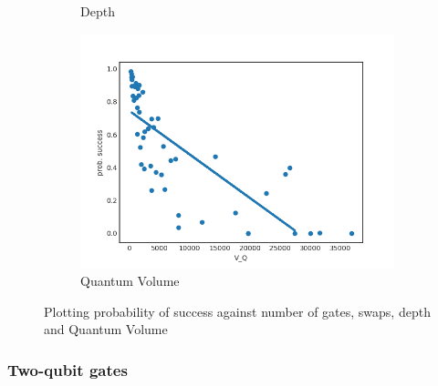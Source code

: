 \documentclass[11pt]{article}
\begin{document}
\begin{figure}[H]
\begin{subfigure}[b]{0.5\linewidth}
    \caption{Depth} 
    \label{fig:ps_d_1000} 
  \end{subfigure}%
  \begin{subfigure}[b]{0.5\linewidth}
    \centering
    \includegraphics[width=0.75\linewidth]{ps_q_1000_0_005} 
    \caption{Quantum Volume} 
    \label{fig:ps_q_1000} 
  \end{subfigure} 
  \caption{Plotting probability of success against number of gates, swaps, depth and Quantum Volume}
  \label{fig:ps_1000} 
\end{figure}

\subsubsection{Two-qubit gates}
\label{sec:org2c8cf7b}
\end{document}
